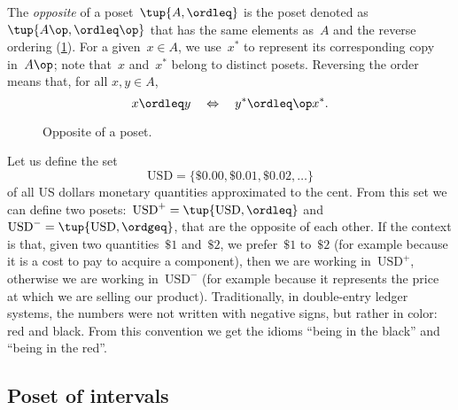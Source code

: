 \begin{definition}
  The \emph{opposite} of a poset~$\tup{A, \ordleq} $ is the poset denoted as~$\tup{A\op, \ordleq\op}$ that has the same elements as~$A$ and the reverse ordering (\cref{fig:opposite}).
  For a given~$x \in A$, we use~$x^*$ to represent its corresponding copy in~$A\op$; note that~$x$ and~$x^*$ belong to distinct posets.
  Reversing the order means that, for all $x,y\in A$,
  \begin{equation}
    x \ordleq y \quad \Leftrightarrow \quad y^* \ordleq\op x^*.
  \end{equation}
\end{definition}

\begin{figure}[tbh]
  \centering
  \caption{Opposite of a poset.\label{fig:opposite}}
\end{figure}


\begin{example}
  Let us define the set
  \begin{equation*}
    \text{USD}=\{\$0.00,\$0.01,\$0.02,\dots\}
  \end{equation*}
  of all US dollars monetary quantities approximated to the cent.
  From this set we can define two posets:~$\text{USD}^{+} = \tup{\text{USD}, \ordleq}$ and~$\text{USD}^{-} = \tup{\text{USD}, \ordgeq}$, that are the opposite of each other.
  If the context is that, given two quantities~$\$1$ and~$\$2$, we prefer~$\$1$ to~$\$2$ (for example because it is a cost to pay to acquire a component), then we are working in~$\text{USD}^{+}$, otherwise we are working in~$\text{USD}^{-}$ (for example because it represents the price at which we are selling our product).
  Traditionally, in double-entry ledger systems, the numbers were not written with negative signs, but rather in color: red and black. From this convention we get the idioms ``being in the black'' and ``being in the red''.
\end{example}

\subsection{Poset of intervals}
